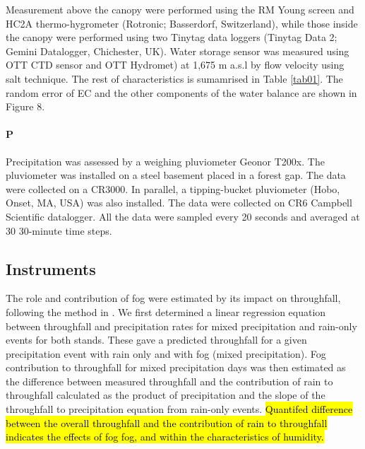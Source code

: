 \documentclass[10pt,letterpaper]{article}
\begin{document}
Measurement above the canopy were performed using the RM Young screen and HC2A thermo-hygrometer (Rotronic; Basserdorf, Switzerland), while those inside the canopy were performed using two Tinytag data loggers (Tinytag Data 2; Gemini Datalogger, Chichester, UK). Water storage sensor was measured using OTT CTD sensor and OTT Hydromet) at 1,675 m a.s.l by flow velocity using salt technique. The rest of characteristics is sumamrised in Table \ref{tab01}. The random error of EC and the other components of the water balance are shown in Figure 8.

\paragraph{P}

Precipitation was assessed by a weighing pluviometer Geonor T200x. The pluviometer was installed on a steel basement placed in a forest gap. The data were collected on a CR3000. In parallel, a tipping-bucket pluviometer (Hobo, Onset, MA, USA) was also installed. The data were collected on CR6 Campbell Scientific datalogger. All the data were sampled every 20 seconds and averaged at 30 30-minute time steps.

\subsection{Instruments}

The role and contribution of fog were estimated by its impact on throughfall, following the method in \cite{Hutley1997}. We first determined a linear regression equation between throughfall and precipitation rates for mixed precipitation and rain-only events for both stands. These gave a predicted throughfall for a given precipitation event with rain only and with fog (mixed precipitation). Fog contribution to throughfall for mixed precipitation days was then estimated as the difference between measured throughfall and the contribution of rain to throughfall calculated as the product of precipitation and the slope of the throughfall to precipitation equation from rain-only events. \hl{Quantifed difference between the overall throughfall and the contribution of rain to throughfall indicates the effects of fog fog, and within the characteristics of humidity.}
\end{document}
